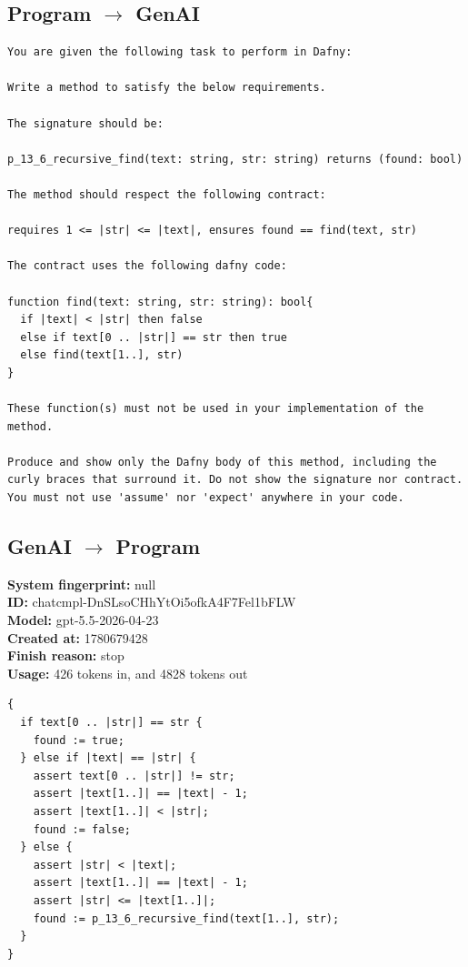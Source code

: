 \documentclass{article}
\begin{document}
\subsection*{Program $\rightarrow$ GenAI}
\begin{lstlisting}
You are given the following task to perform in Dafny:

Write a method to satisfy the below requirements.

The signature should be:

p_13_6_recursive_find(text: string, str: string) returns (found: bool)

The method should respect the following contract:

requires 1 <= |str| <= |text|, ensures found == find(text, str)

The contract uses the following dafny code:

function find(text: string, str: string): bool{
  if |text| < |str| then false
  else if text[0 .. |str|] == str then true
  else find(text[1..], str)
}

These function(s) must not be used in your implementation of the method.

Produce and show only the Dafny body of this method, including the curly braces that surround it. Do not show the signature nor contract. You must not use 'assume' nor 'expect' anywhere in your code.
\end{lstlisting}
\subsection*{GenAI $\rightarrow$ Program}
\textbf{System fingerprint: }null
\\\textbf{ID: }chatcmpl-DnSLsoCHhYtOi5ofkA4F7Fel1bFLW
\\\textbf{Model: }gpt-5.5-2026-04-23
\\\textbf{Created at: }1780679428
\\\textbf{Finish reason: }stop
\\\textbf{Usage: }426 tokens in, and 4828 tokens out
\begin{lstlisting}
{
  if text[0 .. |str|] == str {
    found := true;
  } else if |text| == |str| {
    assert text[0 .. |str|] != str;
    assert |text[1..]| == |text| - 1;
    assert |text[1..]| < |str|;
    found := false;
  } else {
    assert |str| < |text|;
    assert |text[1..]| == |text| - 1;
    assert |str| <= |text[1..]|;
    found := p_13_6_recursive_find(text[1..], str);
  }
}
\end{lstlisting}
\end{document}
